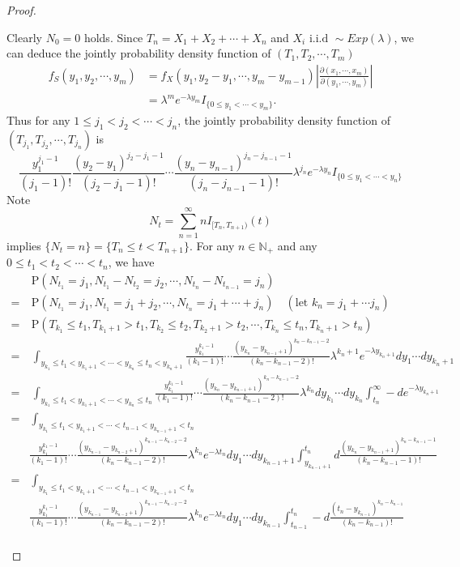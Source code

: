 \documentclass{report}
\theoremstyle{nonumberplain}
\newtheorem{proof}{Proof.}
\begin{document}
\begin{proof}
\begin{itemize}
	\noindent Clearly $N_0=0$ holds. Since $T_n=X_1+X_2+\cdots+X_n$ and $X_i\text{ i.i.d }\sim Exp(\lambda)$, we can deduce the jointly probability density function of $(T_1,T_2,\cdots,T_m)$ 
	\begin{align*}
	f_S(y_1,y_2,\cdots,y_m)&=f_X(y_1,y_2-y_1,\cdots,y_m-y_{m-1})\left|\frac{\partial(x_1,\cdots,x_m)}{\partial(y_1,\cdots,y_m)}\right|\\
	&=\lambda^m e^{-\lambda y_m}I_{\{0\le y_1<\cdots<y_m\}}.
	\end{align*}
	Thus for any $1\le j_1<j_2<\cdots<j_n$, the jointly probability density function of $(T_{j_1},T_{j_2},\cdots,T_{j_n})$ is
	\[
	\frac{y_1^{j_1-1}}{(j_1-1)!}\frac{(y_2-y_1)^{j_2-j_1-1}}{(j_2-j_1-1)!}\cdots\frac{(y_n-y_{n-1})^{j_n-j_{n-1}-1}}{(j_n-j_{n-1}-1)!}\lambda^{j_n}e^{-\lambda y_n}I_{\{0\le y_1<\cdots<y_n\}}
	\]
	Note $$N_t=\sum_{n=1}^{\infty}nI_{[T_n,T_{n+1})}(t)$$ implies $\{N_t=n\}=\{T_n\le t<T_{n+1}\}$. For any $n\in \mathbb{N}_+$ and any $0\le t_1<t_2<\cdots<t_n$, we have
	\begin{align*}
	&\ \mathrm{P}(N_{t_1}=j_1,N_{t_1}-N_{t_2}=j_2,\cdots,N_{t_{n}}-N_{t_{n-1}}=j_n)\\
	=&\ 
	\mathrm{P}(N_{t_1}=j_1,N_{t_1}=j_1+j_2,\cdots,N_{t_{n}}=j_1+\cdots+j_n)\quad(\text{let }k_n=j_1+\cdots j_n)\\
	=&\ \mathrm{P}(T_{k_1}\le t_1,T_{k_1+1}>t_1,T_{k_2}\le t_2,T_{k_2+1}>t_2,\cdots,T_{k_n}\le t_n,T_{k_n+1}>t_n)\\
	=&\ \int_{y_{k_1}\le t_1<y_{k_1+1}<\cdots<y_{k_n}\le t_n<y_{k_n+1}} \frac{y_{k_1}^{k_1-1}}{(k_1-1)!}\cdots\frac{(y_{k_n}-y_{k_{n-1}+1})^{k_n-k_{n-1}-2}}{(k_n-k_{n-1}-2)!}\lambda^{k_n+1}e^{-\lambda y_{k_n+1}}dy_1\cdots dy_{k_n+1}\\
	=&\ \int_{y_{k_1}\le t_1<y_{k_1+1}<\cdots<y_{k_n}\le t_n} \frac{y_{k_1}^{k_1-1}}{(k_1-1)!}\cdots\frac{(y_{k_n}-y_{k_{n-1}+1})^{k_n-k_{n-1}-2}}{(k_n-k_{n-1}-2)!}\lambda^{k_n}dy_{k_1}\cdots dy_{k_n}\int_{t_n}^{\infty}-de^{-\lambda y_{k_n+1}}\\
	=&\ \int_{y_{k_1}\le t_1<y_{k_1+1}<\cdots<t_{n-1}<y_{k_{n-1}+1}< t_n}\\
	&\frac{y_{k_1}^{k_1-1}}{(k_1-1)!}\cdots\frac{(y_{k_{n-1}}-y_{k_{n-2}+1})^{k_{n-1}-k_{n-2}-2}}{(k_n-k_{n-1}-2)!}\lambda^{k_n}e^{-\lambda t_n}dy_1\cdots dy_{k_{n-1}+1}\int_{y_{k_{n-1}+1}}^{t_n}d\frac{(y_{k_n}-y_{k_{n-1}+1})^{k_n-k_{n-1}-1}}{(k_n-k_{n-1}-1)!}\\
	=&\ \int_{y_{k_1}\le t_1<y_{k_1+1}<\cdots<t_{n-1}<y_{k_{n-1}+1}<t_n}\\
	&\frac{y_{k_1}^{k_1-1}}{(k_1-1)!}\cdots\frac{(y_{k_{n-1}}-y_{k_{n-2}+1})^{k_{n-1}-k_{n-2}-2}}{(k_n-k_{n-1}-2)!}\lambda^{k_n}e^{-\lambda t_n}dy_1\cdots dy_{k_{n-1}}\int_{t_{n-1}}^{t_n}-d\frac{(t_{n}-y_{k_{n-1}})^{k_n-k_{n-1}}}{(k_n-k_{n-1})!}\\

\end{align*}
\end{itemize}
\end{proof}
\end{document}
